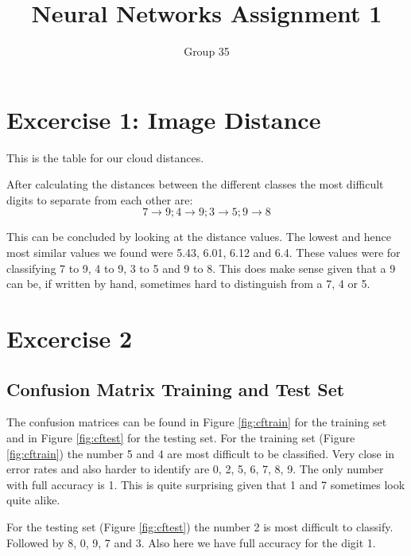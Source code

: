 \documentclass{article}
\begin{document}
\title{Neural Networks Assignment 1}
\author{Group 35}
\maketitle
\lstset{
  basicstyle=\ttfamily,
  keywordstyle=\bfseries,
  language=Java,
  frame=single,
  aboveskip=11pt,
  belowskip=11pt,
  breaklines=true,
  breakatwhitespace=false,
  showspaces=false,
  showstringspaces=false,
  numbers=left,
  stepnumber=1,    
  firstnumber=1,
  numberfirstline=true
}
\section{Excercise 1: Image Distance}
\label{a1}

This is the table for our cloud distances.

After calculating the distances between the different classes the most difficult digits to separate from each other are: \[ 7 \rightarrow 9; 4 \rightarrow 9; 3 \rightarrow 5; 9 \rightarrow 8\]

This can be concluded by looking at the distance values. The lowest and hence most similar values we found were 5.43, 6.01, 6.12 and 6.4.
These values were for classifying 7 to 9, 4 to 9, 3 to 5 and 9 to 8.
This does make sense given that a 9 can be, if written by hand, sometimes hard to distinguish from a 7, 4 or 5.


\section{Excercise 2}
\subsection{Confusion Matrix Training and Test Set}
The confusion matrices can be found in Figure \ref{fig:cftrain} for the training set and in Figure \ref{fig:cftest} for the testing set.
For the training set (Figure \ref{fig:cftrain}) the number 5 and 4 are most difficult to be classified. Very close in error rates and also harder to identify are 0, 2, 5, 6, 7, 8, 9. The only number with full accuracy is 1. This is quite surprising given that 1 and 7 sometimes look quite alike.

For the testing set (Figure \ref{fig:cftest}) the number 2 is most difficult to classify. Followed by 8, 0, 9, 7 and 3. Also here we have full accuracy for the digit 1.
\end{document}
